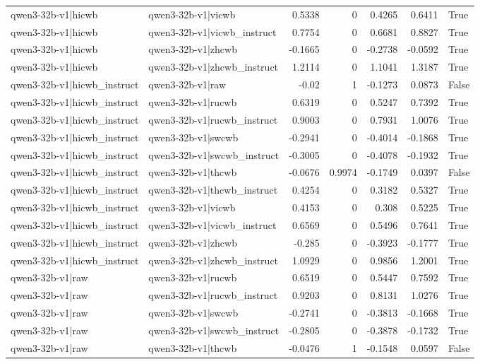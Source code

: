 \begin{table}
\begin{tabular}{l l r r r r l}
qwen3-32b-v1|hicwb & qwen3-32b-v1|vicwb & 0.5338 & 0 & 0.4265 & 0.6411 & True \\
qwen3-32b-v1|hicwb & qwen3-32b-v1|vicwb_instruct & 0.7754 & 0 & 0.6681 & 0.8827 & True \\
qwen3-32b-v1|hicwb & qwen3-32b-v1|zhcwb & -0.1665 & 0 & -0.2738 & -0.0592 & True \\
qwen3-32b-v1|hicwb & qwen3-32b-v1|zhcwb_instruct & 1.2114 & 0 & 1.1041 & 1.3187 & True \\
qwen3-32b-v1|hicwb_instruct & qwen3-32b-v1|raw & -0.02 & 1 & -0.1273 & 0.0873 & False \\
qwen3-32b-v1|hicwb_instruct & qwen3-32b-v1|rucwb & 0.6319 & 0 & 0.5247 & 0.7392 & True \\
qwen3-32b-v1|hicwb_instruct & qwen3-32b-v1|rucwb_instruct & 0.9003 & 0 & 0.7931 & 1.0076 & True \\
qwen3-32b-v1|hicwb_instruct & qwen3-32b-v1|swcwb & -0.2941 & 0 & -0.4014 & -0.1868 & True \\
qwen3-32b-v1|hicwb_instruct & qwen3-32b-v1|swcwb_instruct & -0.3005 & 0 & -0.4078 & -0.1932 & True \\
qwen3-32b-v1|hicwb_instruct & qwen3-32b-v1|thcwb & -0.0676 & 0.9974 & -0.1749 & 0.0397 & False \\
qwen3-32b-v1|hicwb_instruct & qwen3-32b-v1|thcwb_instruct & 0.4254 & 0 & 0.3182 & 0.5327 & True \\
qwen3-32b-v1|hicwb_instruct & qwen3-32b-v1|vicwb & 0.4153 & 0 & 0.308 & 0.5225 & True \\
qwen3-32b-v1|hicwb_instruct & qwen3-32b-v1|vicwb_instruct & 0.6569 & 0 & 0.5496 & 0.7641 & True \\
qwen3-32b-v1|hicwb_instruct & qwen3-32b-v1|zhcwb & -0.285 & 0 & -0.3923 & -0.1777 & True \\
qwen3-32b-v1|hicwb_instruct & qwen3-32b-v1|zhcwb_instruct & 1.0929 & 0 & 0.9856 & 1.2001 & True \\
qwen3-32b-v1|raw & qwen3-32b-v1|rucwb & 0.6519 & 0 & 0.5447 & 0.7592 & True \\
qwen3-32b-v1|raw & qwen3-32b-v1|rucwb_instruct & 0.9203 & 0 & 0.8131 & 1.0276 & True \\
qwen3-32b-v1|raw & qwen3-32b-v1|swcwb & -0.2741 & 0 & -0.3813 & -0.1668 & True \\
qwen3-32b-v1|raw & qwen3-32b-v1|swcwb_instruct & -0.2805 & 0 & -0.3878 & -0.1732 & True \\
qwen3-32b-v1|raw & qwen3-32b-v1|thcwb & -0.0476 & 1 & -0.1548 & 0.0597 & False \\

\end{tabular}
\end{table}
